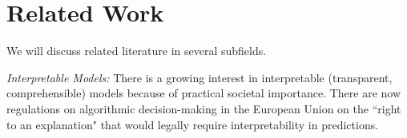 %
%
%
%
%
%

\section{Related Work}


We will discuss related literature in several subfields.

\textit{Interpretable Models:} There is a growing interest in interpretable (transparent, comprehensible) models because of practical societal importance\citep[see][]{ruping2006learning,bratko1997machine,dawes1979robust,VellidoEtAl12,Giraud98,Holte93,Schmueli10,Huysmans11,Freitas14}. There are now regulations on algorithmic decision-making in the European Union on the ``right to an explanation" \citep{Goodman2016EU} that would legally require interpretability in predictions.


%

